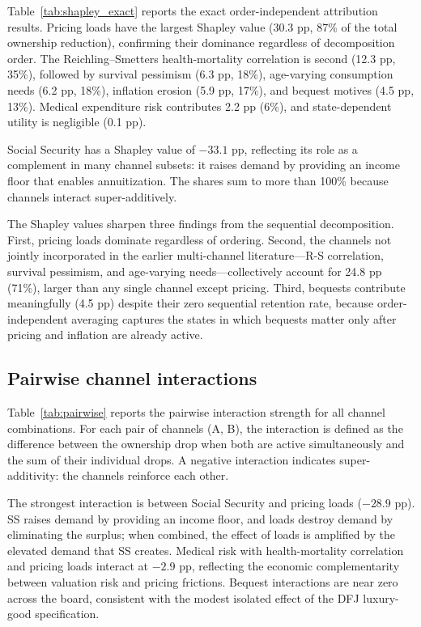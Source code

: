 \documentclass[12pt]{article}
\begin{document}
Table~\ref{tab:shapley_exact} reports the exact order-independent attribution results. Pricing loads have the largest Shapley value (30.3 pp, 87\% of the total ownership reduction), confirming their dominance regardless of decomposition order. The Reichling--Smetters health-mortality correlation is second (12.3 pp, 35\%), followed by survival pessimism (6.3 pp, 18\%), age-varying consumption needs (6.2 pp, 18\%), inflation erosion (5.9 pp, 17\%), and bequest motives (4.5 pp, 13\%). Medical expenditure risk contributes 2.2 pp (6\%), and state-dependent utility is negligible (0.1 pp).

Social Security has a Shapley value of $-33.1$ pp, reflecting its role as a complement in many channel subsets: it raises demand by providing an income floor that enables annuitization. The shares sum to more than 100\% because channels interact super-additively.



The Shapley values sharpen three findings from the sequential decomposition. First, pricing loads dominate regardless of ordering. Second, the channels not jointly incorporated in the earlier multi-channel literature---R-S correlation, survival pessimism, and age-varying needs---collectively account for 24.8 pp (71\%), larger than any single channel except pricing. Third, bequests contribute meaningfully (4.5 pp) despite their zero sequential retention rate, because order-independent averaging captures the states in which bequests matter only after pricing and inflation are already active.

\subsection{Pairwise channel interactions}

Table~\ref{tab:pairwise} reports the pairwise interaction strength for all channel combinations. For each pair of channels (A, B), the interaction is defined as the difference between the ownership drop when both are active simultaneously and the sum of their individual drops. A negative interaction indicates super-additivity: the channels reinforce each other.



The strongest interaction is between Social Security and pricing loads ($-28.9$ pp). SS raises demand by providing an income floor, and loads destroy demand by eliminating the surplus; when combined, the effect of loads is amplified by the elevated demand that SS creates. Medical risk with health-mortality correlation and pricing loads interact at $-2.9$ pp, reflecting the economic complementarity between valuation risk and pricing frictions. Bequest interactions are near zero across the board, consistent with the modest isolated effect of the DFJ luxury-good specification.
\end{document}

